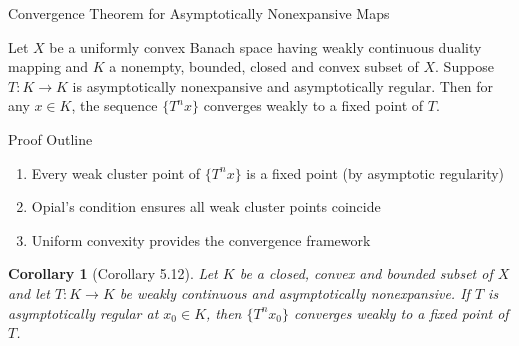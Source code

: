 \documentclass[aspectratio=169,10pt]{beamer}
\newtheorem{corollary}[theorem]{Corollary}
\begin{document}
\begin{frame}[allowframebreaks]{Convergence Theorem for Asymptotically Nonexpansive Maps}
    \begin{theorem}
        Let $X$ be a uniformly convex Banach space having weakly continuous duality mapping and $K$ a nonempty, bounded, closed and convex subset of $X$. Suppose $T: K \to K$ is asymptotically nonexpansive and asymptotically regular. Then for any $x \in K$, the sequence $\{T^n x\}$ converges weakly to a fixed point of $T$.
    \end{theorem}

    \begin{block}{Proof Outline}
        \begin{enumerate}
            \item Every weak cluster point of $\{T^n x\}$ is a fixed point (by asymptotic regularity)
            \item Opial's condition ensures all weak cluster points coincide
            \item Uniform convexity provides the convergence framework
        \end{enumerate}
    \end{block}

    \begin{corollary}[Corollary 5.12]
        Let $K$ be a closed, convex and bounded subset of $X$ and let $T: K \to K$ be weakly continuous and asymptotically nonexpansive. If $T$ is asymptotically regular at $x_0 \in K$, then $\{T^n x_0\}$ converges weakly to a fixed point of $T$.
    \end{corollary}
\end{frame}
\end{document}
